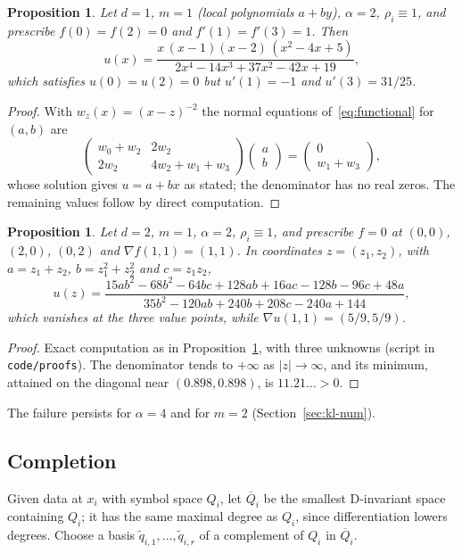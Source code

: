 \documentclass[12pt]{amsart}
\newtheorem{proposition}[theorem]{Proposition}
\theoremstyle{definition}
\theoremstyle{remark}
\begin{document}
\begin{proposition}\label{prop:kl}
Let $d=1$, $m=1$ (local polynomials $a+by$), $\alpha=2$, $\rho_i\equiv1$, and prescribe
$f(0)=f(2)=0$ and $f'(1)=f'(3)=1$. Then
\[
  u(x)=\frac{x\,(x-1)(x-2)\,(x^2-4x+5)}{2x^4-14x^3+37x^2-42x+19},
\]
which satisfies $u(0)=u(2)=0$ but $u'(1)=-1$ and $u'(3)=31/25$.
\end{proposition}

\begin{proof}
With $w_z(x)=(x-z)^{-2}$ the normal equations of~\eqref{eq:functional} for $(a,b)$ are
\[
  \begin{pmatrix} w_0+w_2 & 2w_2\\ 2w_2 & 4w_2+w_1+w_3\end{pmatrix}
  \begin{pmatrix} a\\ b\end{pmatrix}=\begin{pmatrix} 0\\ w_1+w_3\end{pmatrix},
\]
whose solution gives $u=a+bx$ as stated; the denominator has no real zeros. The remaining
values follow by direct computation.
\end{proof}

\begin{proposition}\label{prop:kl2}
Let $d=2$, $m=1$, $\alpha=2$, $\rho_i\equiv1$, and prescribe $f=0$ at $(0,0)$, $(2,0)$, $(0,2)$
and $\nabla f(1,1)=(1,1)$. In coordinates $z=(z_1,z_2)$, with $a=z_1+z_2$, $b=z_1^2+z_2^2$ and
$c=z_1z_2$,
\[
  u(z)=\frac{15ab^2-68b^2-64bc+128ab+16ac-128b-96c+48a}{35b^2-120ab+240b+208c-240a+144},
\]
which vanishes at the three value points, while $\nabla u(1,1)=(5/9,5/9)$.
\end{proposition}

\begin{proof}
Exact computation as in Proposition~\ref{prop:kl}, with three unknowns (script in
\texttt{code/proofs}). The denominator tends to $+\infty$ as $|z|\to\infty$, and its
minimum, attained on the diagonal near $(0.898,0.898)$, is $11.21\ldots>0$.
\end{proof}

The failure persists for $\alpha=4$ and for $m=2$ (Section~\ref{sec:kl-num}).

\subsection{Completion}
Given data at $x_i$ with symbol space $Q_i$, let $\overline{Q}_i$ be the smallest D-invariant
space containing $Q_i$; it has the same maximal degree as $Q_i$, since differentiation lowers
degrees. Choose a basis $\tilde q_{i,1},\dots,\tilde q_{i,r}$ of a complement of $Q_i$ in
$\overline{Q}_i$.
\end{document}

